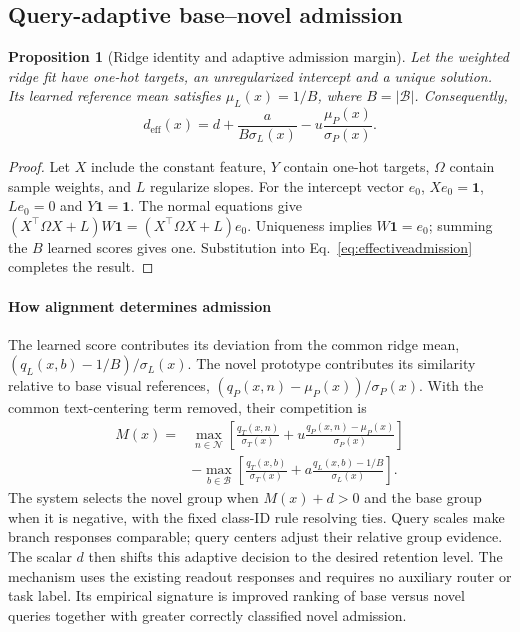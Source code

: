\documentclass[preprint,review,12pt]{elsarticle}
\newtheorem{proposition}{Proposition}
\begin{document}
\subsection{Query-adaptive base--novel admission}
\begin{proposition}[Ridge identity and adaptive admission margin]
Let the weighted ridge fit have one-hot targets, an unregularized intercept and a unique solution. Its learned reference mean satisfies $\mu_L(x)=1/B$, where $B=|\mathcal B|$. Consequently,
\begin{equation}
 d_{\mathrm{eff}}(x)=d+\frac{a}{B\sigma_L(x)}-u\frac{\mu_P(x)}{\sigma_P(x)}.
 \label{eq:ridgeoffset}
\end{equation}
\end{proposition}
\begin{proof}
Let $X$ include the constant feature, $Y$ contain one-hot targets, $\Omega$ contain sample weights, and $L$ regularize slopes. For the intercept vector $e_0$, $Xe_0=\mathbf1$, $Le_0=0$ and $Y\mathbf1=\mathbf1$. The normal equations give
$(X^\top\Omega X+L)W\mathbf1=(X^\top\Omega X+L)e_0$.
Uniqueness implies $W\mathbf1=e_0$; summing the $B$ learned scores gives one. Substitution into Eq.~\eqref{eq:effectiveadmission} completes the result.
\end{proof}
\paragraph{How alignment determines admission}
The learned score contributes its deviation from the common ridge mean, $(q_L(x,b)-1/B)/\sigma_L(x)$. The novel prototype contributes its similarity relative to base visual references, $(q_P(x,n)-\mu_P(x))/\sigma_P(x)$. With the common text-centering term removed, their competition is
\begin{equation}
\begin{split}
M(x)={}&\max_{n\in\mathcal N}\left[\frac{q_T(x,n)}{\sigma_T(x)}+u\frac{q_P(x,n)-\mu_P(x)}{\sigma_P(x)}\right]\\
&-\max_{b\in\mathcal B}\left[\frac{q_T(x,b)}{\sigma_T(x)}+a\frac{q_L(x,b)-1/B}{\sigma_L(x)}\right].
\end{split}
\label{eq:jointmargin}
\end{equation}
The system selects the novel group when $M(x)+d>0$ and the base group when it is negative, with the fixed class-ID rule resolving ties. Query scales make branch responses comparable; query centers adjust their relative group evidence. The scalar $d$ then shifts this adaptive decision to the desired retention level. The mechanism uses the existing readout responses and requires no auxiliary router or task label. Its empirical signature is improved ranking of base versus novel queries together with greater correctly classified novel admission.
\end{document}
